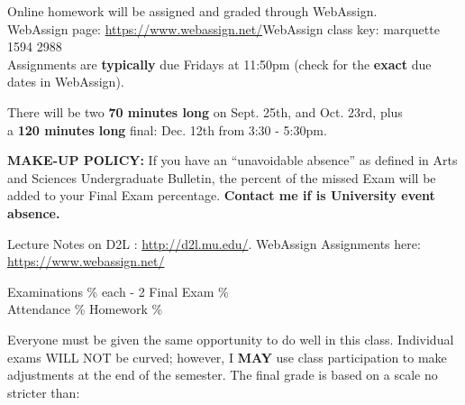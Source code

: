 \documentclass[10pt]{article}
\begin{document}
\begin{description}
\item[Homework:] Online homework will be assigned and graded through WebAssign.\\
WebAssign page: \url{https://www.webassign.net/}\qquad\qquad\qquad\qquad WebAssign class key: {\color{blue}marquette 1594 2988}\\ 
Assignments are \textbf{typically} due Fridays at 11:50pm (check for the \textbf{exact} due dates in WebAssign). 

\item[Exams:] There will be two {\bf{70 minutes long}} on Sept. 25th, and Oct. 23rd, plus\\
\hspace*{5.2mm} a {\bf{120 minutes long}} final: Dec. 12th from 3:30 - 5:30pm. \vspace{-.1in}

\item \textbf{MAKE-UP POLICY:} If you have an ``unavoidable absence'' as defined in Arts and Sciences Undergraduate Bulletin, the percent of the missed Exam will be added to your Final Exam percentage. \textbf{Contact me if is University event absence.}

\item[Websites:] Lecture Notes on D2L : \url{http://d2l.mu.edu/}. WebAssign Assignments here: \url{https://www.webassign.net/}

\item[Grading:] Examinations  \% each - 2 \qquad\qquad\qquad Final Exam  \% \\
\hspace*{7.5mm} Attendance \% \qquad\qquad\qquad\qquad\qquad Homework \%\vspace{-.1in}
 
Everyone must be given the same opportunity to do well in this class. Individual exams WILL NOT be curved; however, I \textbf{MAY} use class participation to make adjustments at the end of the semester. The final grade is based on a scale no stricter than:\vspace{-.05in}


\end{description}
\end{document}
